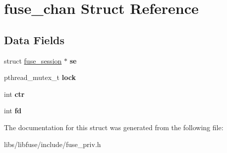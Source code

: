 \hypertarget{structfuse__chan}{}\section{fuse\+\_\+chan Struct Reference}
\label{structfuse__chan}
\subsection*{Data Fields}
\begin{DoxyCompactItemize}
\item 
struct \hyperlink{structfuse__session}{fuse\+\_\+session} $\ast$ {\bfseries se}\hypertarget{structfuse__chan_ad43b4cec17ae85bf833f4a604b6c08eb}{}\label{structfuse__chan_ad43b4cec17ae85bf833f4a604b6c08eb}

\item 
pthread\+\_\+mutex\+\_\+t {\bfseries lock}\hypertarget{structfuse__chan_a1d3e9d3f9716bd8800442526733e1ea0}{}\label{structfuse__chan_a1d3e9d3f9716bd8800442526733e1ea0}

\item 
int {\bfseries ctr}\hypertarget{structfuse__chan_a3dd351edcf950968cc7b93e29511d0e0}{}\label{structfuse__chan_a3dd351edcf950968cc7b93e29511d0e0}

\item 
int {\bfseries fd}\hypertarget{structfuse__chan_a8bf2d47e813eb2e31426597bd580fea3}{}\label{structfuse__chan_a8bf2d47e813eb2e31426597bd580fea3}

\end{DoxyCompactItemize}


The documentation for this struct was generated from the following file\+:\begin{DoxyCompactItemize}
\item 
libs/libfuse/include/fuse\+\_\+priv.\+h\end{DoxyCompactItemize}
